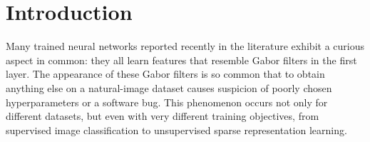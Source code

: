 
\section{Introduction}

Many trained neural networks reported recently in the literature exhibit a curious aspect in common: they all learn features that resemble Gabor filters in the first layer.
The appearance of these Gabor filters is so common that to obtain anything else on a natural-image dataset causes suspicion of poorly chosen hyperparameters or a software bug. 
This phenomenon occurs not only for different datasets, but even with very different training objectives, from supervised image classification \citep{Krizhevsky-2012} to unsupervised sparse representation learning\cite{Le-2011-ICA}.


%
%
%
%
%
%
%
%
%


